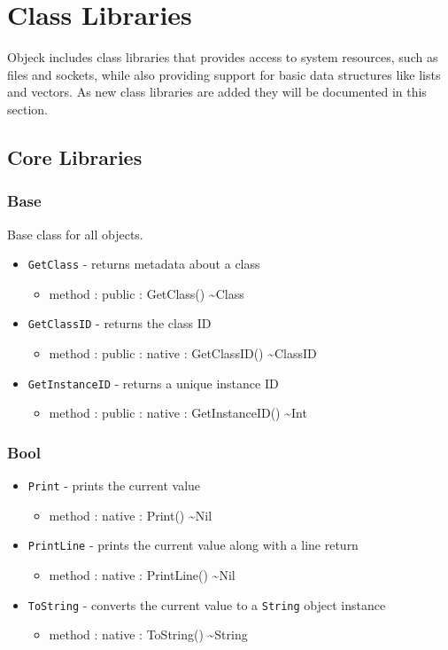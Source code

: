 \documentclass[12pt]{article}
\begin{document}
\section{Class Libraries}
Objeck includes class libraries that provides access to system
resources, such as files and sockets, while also providing support for
basic data structures like lists and vectors.  As new class libraries
are added they will be documented in this section.

\subsection{Core Libraries}
\subsubsection{Base}
Base class for all objects.
\begin{itemize}
\item \texttt{GetClass} - returns metadata about a class
  \begin{itemize}
  \item method : public : GetClass() \textasciitilde Class
  \end{itemize}
\item \texttt{GetClassID} - returns the class ID
  \begin{itemize}
  \item method : public : native : GetClassID() \textasciitilde ClassID
  \end{itemize}
\item \texttt{GetInstanceID} - returns a unique instance ID
  \begin{itemize}
  \item method : public : native : GetInstanceID() \textasciitilde Int
  \end{itemize}
\end{itemize}

\subsubsection{Bool}
\begin{itemize}
\item \texttt{Print} - prints the current value
  \begin{itemize}
  \item method : native : Print() \textasciitilde Nil
  \end{itemize}
\item \texttt{PrintLine} - prints the current value along with a line
  return
  \begin{itemize}
  \item method : native : PrintLine() \textasciitilde Nil
  \end{itemize}
\item \texttt{ToString} - converts the current value to a
  \texttt{String} object instance
  \begin{itemize}
  \item method : native : ToString() \textasciitilde String
  \end{itemize}
\end{itemize}
\end{document}
